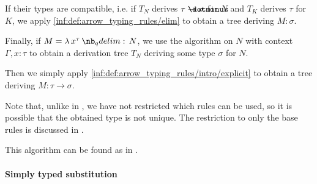 \begin{algorithm}
\begin{thmenum}
    If their types are compatible, i.e. if \( T_N \) derives \( \tau \synimplies \sigma \) for \( N \) and \( T_K \) derives \( \tau \) for \( K \), we apply \ref{inf:def:arrow_typing_rules/elim} to obtain a tree deriving \( M: \sigma \).

     Finally, if \( M = \qabs {x^\tau} N \), we use the algorithm on \( N \) with context \( \Gamma, x: \tau \) to obtain a derivation tree \( T_N \) deriving some type \( \sigma \) for \( N \).

    Then we simply apply \ref{inf:def:arrow_typing_rules/intro/explicit} to obtain a tree deriving \( M: \tau \to \sigma \).
  \end{thmenum}
\end{algorithm}
\begin{comments}
  \item Note that, unlike in , we have not restricted which rules can be used, so it is possible that the obtained type is not unique. The restriction to only the base rules is discussed in .

  \item This algorithm can be found as  in \cite{notebook:code}.
\end{comments}

\paragraph{Simply typed substitution}

